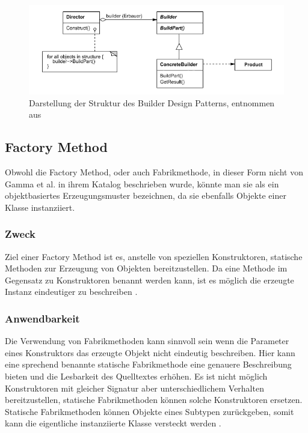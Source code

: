 \documentclass[12pt,oneside,a4paper,parskip]{scrbook}
\begin{document}
\begin{figure}[htbp]
	\centering
	\includegraphics[width=1.0\textwidth]{bilder/builder}
	\caption{Darstellung der Struktur des Builder Design Patterns, entnommen aus \cite[S. 162]{gamma2015}}
	\label{fig:builder}
\end{figure}

\subsection{Factory Method}

Obwohl die Factory Method, oder auch Fabrikmethode, in dieser Form nicht von Gamma et al. in ihrem Katalog beschrieben wurde, könnte man sie als ein objektbasiertes Erzeugungsmuster bezeichnen, da sie ebenfalls Objekte einer Klasse instanziiert.

\subsubsection{Zweck}

Ziel einer Factory Method ist es, anstelle von speziellen Konstruktoren,  statische Methoden zur Erzeugung von Objekten bereitzustellen. Da eine Methode im Gegensatz zu Konstruktoren benannt werden kann, ist es möglich die erzeugte Instanz eindeutiger zu beschreiben \cite[S. 5f]{bloch2017}. 

\subsubsection{Anwendbarkeit}

Die Verwendung von Fabrikmethoden kann sinnvoll sein wenn die Parameter eines Konstruktors das erzeugte Objekt nicht eindeutig beschreiben. Hier kann eine sprechend benannte statische Fabrikmethode eine genauere Beschreibung bieten und die Lesbarkeit des Quelltextes erhöhen. Es ist nicht möglich Konstruktoren mit gleicher Signatur aber unterschiedlichem Verhalten bereitzustellen, statische Fabrikmethoden können solche Konstruktoren ersetzen. Statische Fabrikmethoden können Objekte eines Subtypen zurückgeben, somit kann die eigentliche instanziierte Klasse versteckt werden \cite[S. 5ff]{bloch2017}.
\end{document}
